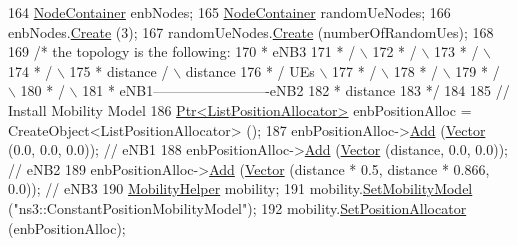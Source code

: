 \begin{DoxyCode}
164   \hyperlink{classns3_1_1NodeContainer}{NodeContainer} enbNodes;
165   \hyperlink{classns3_1_1NodeContainer}{NodeContainer} randomUeNodes;
166   enbNodes.\hyperlink{classns3_1_1NodeContainer_a787f059e2813e8b951cc6914d11dfe69}{Create} (3);
167   randomUeNodes.\hyperlink{classns3_1_1NodeContainer_a787f059e2813e8b951cc6914d11dfe69}{Create} (numberOfRandomUes);
168 
169   \textcolor{comment}{/*   the topology is the following:}
170 \textcolor{comment}{   *                 eNB3}
171 \textcolor{comment}{   *                /     \(\backslash\)}
172 \textcolor{comment}{   *               /       \(\backslash\)}
173 \textcolor{comment}{   *              /         \(\backslash\)}
174 \textcolor{comment}{   *             /           \(\backslash\)}
175 \textcolor{comment}{   *   distance /             \(\backslash\) distance}
176 \textcolor{comment}{   *           /      UEs      \(\backslash\)}
177 \textcolor{comment}{   *          /                 \(\backslash\)}
178 \textcolor{comment}{   *         /                   \(\backslash\)}
179 \textcolor{comment}{   *        /                     \(\backslash\)}
180 \textcolor{comment}{   *       /                       \(\backslash\)}
181 \textcolor{comment}{   *   eNB1-------------------------eNB2}
182 \textcolor{comment}{   *                  distance}
183 \textcolor{comment}{   */}
184 
185   \textcolor{comment}{// Install Mobility Model}
186   \hyperlink{classns3_1_1Ptr}{Ptr<ListPositionAllocator>} enbPositionAlloc = 
      CreateObject<ListPositionAllocator> ();
187   enbPositionAlloc->\hyperlink{classns3_1_1ListPositionAllocator_a460e82f015ac012a73ba0ea0cccb3486}{Add} (\hyperlink{classns3_1_1Vector3D_a7e59b47bc94c9cb1dadff68c1d0112d8}{Vector} (0.0, 0.0, 0.0));                       \textcolor{comment}{// eNB1}
188   enbPositionAlloc->\hyperlink{classns3_1_1ListPositionAllocator_a460e82f015ac012a73ba0ea0cccb3486}{Add} (\hyperlink{classns3_1_1Vector3D_a7e59b47bc94c9cb1dadff68c1d0112d8}{Vector} (distance,  0.0, 0.0));                 \textcolor{comment}{// eNB2}
189   enbPositionAlloc->\hyperlink{classns3_1_1ListPositionAllocator_a460e82f015ac012a73ba0ea0cccb3486}{Add} (\hyperlink{classns3_1_1Vector3D_a7e59b47bc94c9cb1dadff68c1d0112d8}{Vector} (distance * 0.5, distance * 0.866, 0.0));   \textcolor{comment}{// eNB3}
190   \hyperlink{classns3_1_1MobilityHelper}{MobilityHelper} mobility;
191   mobility.\hyperlink{classns3_1_1MobilityHelper_a030275011b6f40682e70534d30280aba}{SetMobilityModel} (\textcolor{stringliteral}{"ns3::ConstantPositionMobilityModel"});
192   mobility.\hyperlink{classns3_1_1MobilityHelper_ac59d5295076be3cc11021566713a28c5}{SetPositionAllocator} (enbPositionAlloc);

\end{DoxyCode}
